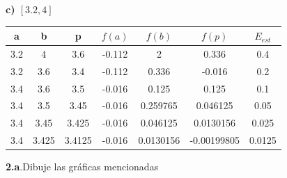 \documentclass[12pt]{article}
\begin{document}
\textbf{c) $[3.2, 4]$}
\begin{center}
    \begin{tabular}{|c|c|c|c|c|c|c|}
        \hline
        a & b&p&$f(a)$&$f(b)$&$f(p)$&$E_{est}$\\
        \hline
        3.2      & 4      &  3.6     & -0.112       & 2       & 0.336    & 0.4\\
        3.2    & 3.6      &  3.4    & -0.112   & 0.336       & -0.016  & 0.2\\
        3.4    & 3.6   &  3.5   & -0.016   & 0.125& 0.125  & 0.1\\
        3.4    & 3.5  &  3.45  & -0.016   & 0.259765& 0.046125 & 0.05\\
        3.4 & 3.45  &  3.425 & -0.016& 0.046125& 0.0130156 & 0.025\\
        3.4 & 3.425&  3.4125& -0.016& 0.0130156& -0.00199805& 0.0125\\
        \hline
      \end{tabular} 
\end{center}


\textbf{2.a}.Dibuje las gráficas mencionadas 
\end{document}
